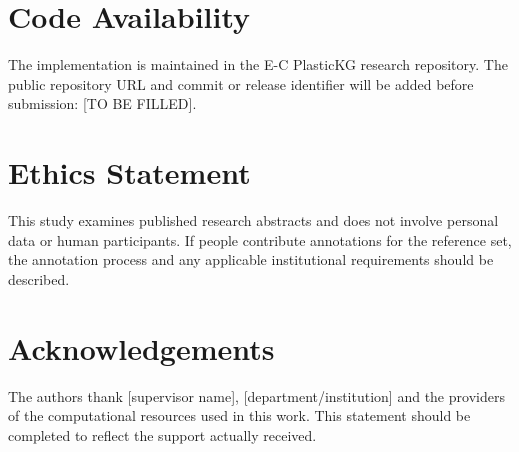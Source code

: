 \documentclass[11pt,a4paper]{article}
\begin{document}
\section*{Code Availability}
The implementation is maintained in the E-C PlasticKG research repository. The public repository URL and commit or release identifier will be added before submission: [TO BE FILLED].

\section*{Ethics Statement}
This study examines published research abstracts and does not involve personal data or human participants. If people contribute annotations for the reference set, the annotation process and any applicable institutional requirements should be described.

\section*{Acknowledgements}
The authors thank [supervisor name], [department/institution] and the providers of the computational resources used in this work. This statement should be completed to reflect the support actually received.
\end{document}
